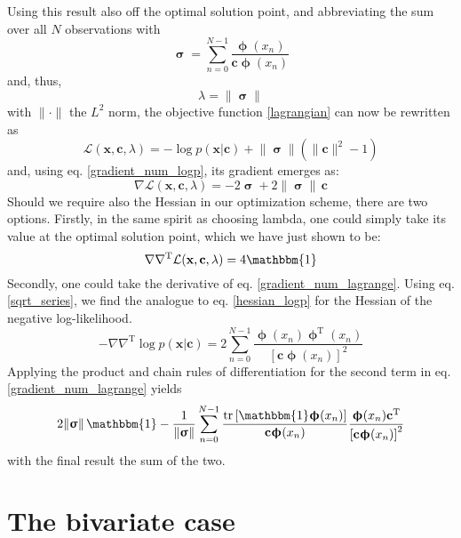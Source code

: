 \documentclass[]{report}
\begin{document}
		Using this result also off the optimal solution point, and abbreviating the sum over all $N$ observations with
		\begin{equation}
			\bm{\upsigma} = \sum_{n=0}^{N-1}\frac{\bm{\upphi}(x_n)}{\mathbf{c}\bm{\upphi}(x_n)} 
		\end{equation}
		and, thus,
		\begin{equation}
			\lambda = \lVert\bm{\upsigma}\rVert
		\end{equation}
		with $\lVert\cdot\rVert$ the $L^2$ norm, the objective function \ref{lagrangian} can now be rewritten as
		\begin{equation}
			\mathcal{L}(\mathbf{x},\mathbf{c},\lambda) = -\log p(\mathbf{x}\vert\mathbf{c}) + \lVert\bm{\upsigma}\rVert\left(\lVert\mathbf{c}\rVert^2-1\right)
		\end{equation}
		and, using eq. \ref{gradient_num_logp}, its gradient emerges as:
		\begin{equation}\label{gradient_num_lagrange}
			\nabla\mathcal{L}(\mathbf{x},\mathbf{c},\lambda) = -2\bm{\upsigma} + 2\lVert\bm{\upsigma}\rVert\,\mathbf{c}
		\end{equation}
		Should we require also the Hessian in our optimization scheme, there are two options. Firstly, in the same spirit as choosing lambda, one could simply take its value at the optimal solution point, which we have just shown to be:
		\begin{equation}
			\nabla\nabla^\mathrm{T}\mathcal{L}(\mathbf{x},\mathbf{c},\lambda) = 4\mathbbm{1}
		\end{equation}
		Secondly, one could take the derivative of eq. \ref{gradient_num_lagrange}. Using eq. \ref{sqrt_series}, we find the analogue to eq. \ref{hessian_logp} for the Hessian of the negative log-likelihood.
		\begin{equation}
			-\nabla\nabla^\mathrm{T}\log p(\mathbf{x}\vert\mathbf{c}) = 2\sum_{n=0}^{N-1}\frac{\bm{\upphi}(x_n)\bm{\upphi}^\mathrm{T}(x_n)}{\left[\mathbf{c}\bm{\upphi}(x_n)\right]^2}
		\end{equation}
		Applying the product and chain rules of differentiation for the second term in eq. \ref{gradient_num_lagrange} yields
		\begin{equation}
			2\lVert\bm{\upsigma}\rVert\,\mathbbm{1} - \frac{1}{\lVert\bm{\upsigma}\rVert}\sum_{n=0}^{N-1}\frac{\mathrm{tr}\left[\mathbbm{1}\bm{\upphi}(x_n)\right]}{\mathbf{c}\bm{\upphi}(x_n)}\frac{\bm{\upphi}(x_n)\mathbf{c}^\mathrm{T}}{\left[\mathbf{c}\bm{\upphi}(x_n)\right]^2}
		\end{equation}
		with the final result the sum of the two.
		
	\section{The bivariate case}
				
\end{document}
